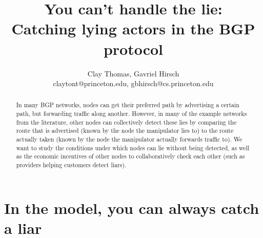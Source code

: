 \documentclass[12pt]{article}
\begin{document}
 
\title{You can't handle the lie: \\
  Catching lying actors in the BGP protocol }
\author{Clay Thomas, Gavriel Hirsch\\
claytont@princeton.edu, gbhirsch@cs.princeton.edu }
\maketitle

\begin{abstract}
  In many BGP networks, nodes can get their preferred path
  by advertising a certain path, but forwarding traffic along another.
  However, in many of the example networks from the literature,
  other nodes can collectively detect these lies
  by comparing the route that is advertised (known by the node
  the manipulator lies to)
  to the route actually taken
  (known by the node the manipulator actually forwards traffic to).
  We want to study the conditions under which nodes
  can lie without being detected,
  as well as the economic incentives of other nodes to collaboratively
  check each other (such as providers helping customers detect liars).
\end{abstract}

\section{In the \cite{RoutingGames} model, you can always catch a liar}
\end{document}
